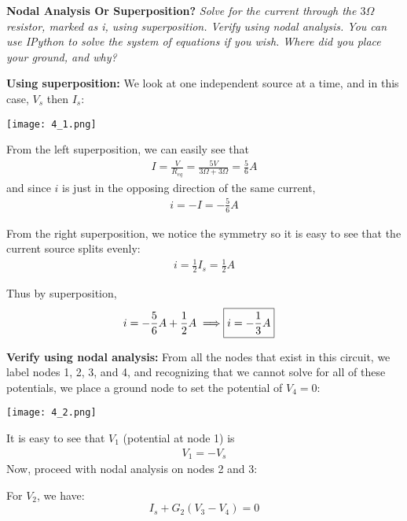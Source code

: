 \documentclass[letter]{article}
\newenvironment{menumerate}{%
  \edef\backupindent{\the\parindent}%
  \enumerate%
  \setlength{\parindent}{\backupindent}%
}{\endenumerate}
\begin{document}
\begin{menumerate}
    \item \textbf{Nodal Analysis Or Superposition?} \emph{Solve for the current through the $3\Omega$ resistor, marked as i, using superposition. Verify using nodal analysis. You can use IPython to solve the system of equations if you wish. Where did you place your ground, and why?}

    \textbf{Using superposition:}
    We look at one independent source at a time, and in this case, $V_s$ then $I_s$:
    \begin{center}
    \texttt{[image: 4\_1.png]}
    \end{center}

    From the left superposition, we can easily see that
    \begin{align}
        I = \frac{V}{R_{eq}} = \frac{5V}{3\Omega + 3\Omega} = \frac{5}{6}A
    \end{align}
    and since $i$ is just in the opposing direction of the same current,
    \begin{align}
        i = -I = -\frac{5}{6}A
    \end{align}

    From the right superposition, we notice the symmetry so it is easy to see that the current source splits evenly:
    \begin{align}
        i = \frac{1}{2}I_s = \frac{1}{2}A
    \end{align}

    Thus by superposition,
    \begin{align}
        i = -\frac{5}{6}A + \frac{1}{2}A \implies \Aboxed{i = -\frac{1}{3}A}
    \end{align}

    \textbf{Verify using nodal analysis:}
    From all the nodes that exist in this circuit, we label nodes 1, 2, 3, and 4, and recognizing that we cannot solve for all of these potentials, we place a ground node to set the potential of $V_4 = 0$:
    \begin{center}
    \texttt{[image: 4\_2.png]}
    \end{center}
    It is easy to see that $V_1$ (potential at node 1) is
    \begin{align}
        V_1 = -V_s
    \end{align}
    Now, proceed with nodal analysis on nodes 2 and 3:

    For $V_2$, we have:
    \begin{equation}
        I_s + G_2(V_3 - V_4) = 0
    \end{equation}


\end{menumerate}
\end{document}
